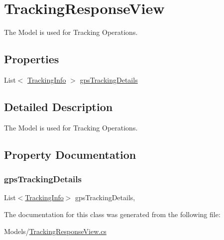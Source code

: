 \hypertarget{classWildlifeTrackingApp_1_1Models_1_1TrackingResponseView}{}\section{Tracking\+Response\+View}
\label{classWildlifeTrackingApp_1_1Models_1_1TrackingResponseView}


The Model is used for Tracking Operations.  


\subsection*{Properties}
\begin{DoxyCompactItemize}
\item 
List$<$ \hyperlink{classWildlifeTrackingApp_1_1Models_1_1TrackingInfo}{Tracking\+Info} $>$ \hyperlink{classWildlifeTrackingApp_1_1Models_1_1TrackingResponseView_a07124fec3465fa0f46602a823134ed2a}{gps\+Tracking\+Details}
\end{DoxyCompactItemize}


\subsection{Detailed Description}
The Model is used for Tracking Operations. 



\subsection{Property Documentation}
\mbox{\label{classWildlifeTrackingApp_1_1Models_1_1TrackingResponseView_a07124fec3465fa0f46602a823134ed2a}} 
\subsubsection{\texorpdfstring{gps\+Tracking\+Details}{gpsTrackingDetails}}
{\footnotesize\ttfamily List$<$\hyperlink{classWildlifeTrackingApp_1_1Models_1_1TrackingInfo}{Tracking\+Info}$>$ gps\+Tracking\+Details\hspace{0.3cm}{\ttfamily [get]}, {\ttfamily [set]}}



The documentation for this class was generated from the following file\+:\begin{DoxyCompactItemize}
\item 
Models/\hyperlink{TrackingResponseView_8cs}{Tracking\+Response\+View.\+cs}\end{DoxyCompactItemize}
